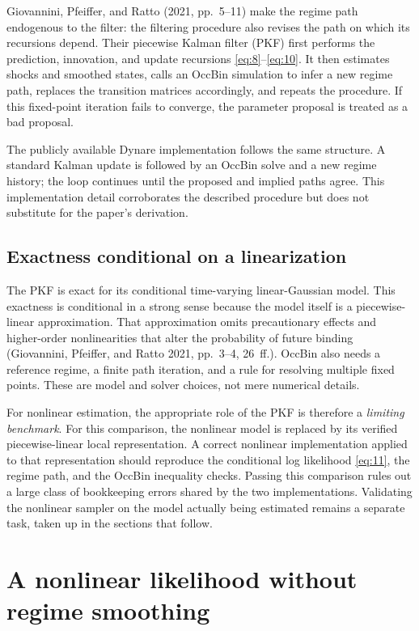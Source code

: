 \documentclass[11pt]{article}
\begin{document}
Giovannini, Pfeiffer, and Ratto (2021, pp.~5--11) make the regime path endogenous to the filter: the filtering procedure also revises the path on which its recursions depend. Their piecewise Kalman filter (PKF) first performs the prediction, innovation, and update recursions \eqref{eq:8}--\eqref{eq:10}. It then estimates shocks and smoothed states, calls an OccBin simulation to infer a new regime path, replaces the transition matrices accordingly, and repeats the procedure. If this fixed-point iteration fails to converge, the parameter proposal is treated as a bad proposal.

The publicly available Dynare implementation follows the same structure. A standard Kalman update is followed by an OccBin solve and a new regime history; the loop continues until the proposed and implied paths agree. This implementation detail corroborates the described procedure but does not substitute for the paper's derivation.

\subsection{Exactness conditional on a linearization}\label{sec:linear-limits}

The PKF is exact for its conditional time-varying linear-Gaussian model. This exactness is conditional in a strong sense because the model itself is a piecewise-linear approximation. That approximation omits precautionary effects and higher-order nonlinearities that alter the probability of future binding (Giovannini, Pfeiffer, and Ratto 2021, pp.~3--4, 26~ff.). OccBin also needs a reference regime, a finite path iteration, and a rule for resolving multiple fixed points. These are model and solver choices, not mere numerical details.

For nonlinear estimation, the appropriate role of the PKF is therefore a \emph{limiting benchmark}. For this comparison, the nonlinear model is replaced by its verified piecewise-linear local representation. A correct nonlinear implementation applied to that representation should reproduce the conditional log likelihood \eqref{eq:11}, the regime path, and the OccBin inequality checks. Passing this comparison rules out a large class of bookkeeping errors shared by the two implementations. Validating the nonlinear sampler on the model actually being estimated remains a separate task, taken up in the sections that follow.

\section{A nonlinear likelihood without regime smoothing}
\label{sec:particle}
\end{document}
